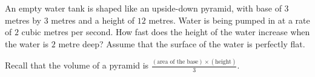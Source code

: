 \documentclass[../main.tex]{subfiles}
\begin{document}
  \begin{example}
    An empty water tank is shaped like an upside-down pyramid, with base of \(3\) metres by \(3\) metres and a height of \(12\) metres. Water is being pumped in at a rate of \(2\) cubic metres per second. How fast does the height of the water increase when the water is \(2\) metre deep? Assume that the surface of the water is perfectly flat. 

    Recall that the volume of a pyramid is \(\frac{(\text{area of the base}) \times (\text{height})}{3}\).
  \end{example}
\end{document}
